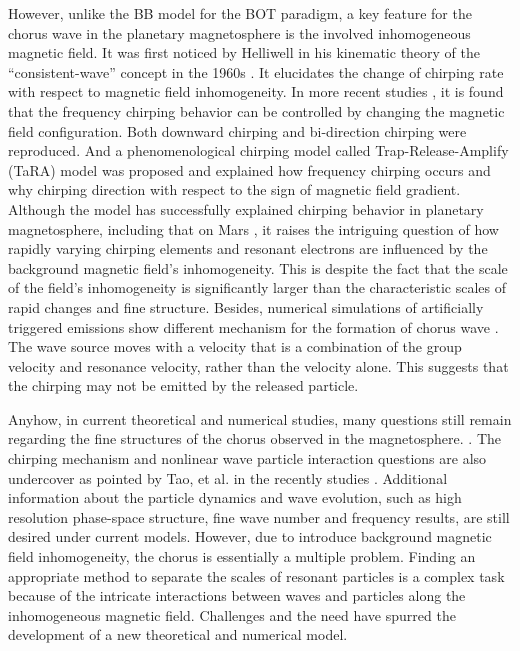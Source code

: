 However, unlike the BB model for the BOT paradigm, a key feature for the chorus wave in the planetary magnetosphere is the involved inhomogeneous magnetic field. 
It was first noticed by Helliwell in his kinematic theory of the ``consistent-wave'' concept in the 1960s \cite{helliwell_theory_1967}.
It elucidates the change of chirping rate with respect to magnetic field inhomogeneity.
In more recent studies \cite{wu_controlling_2020,fujiwara2023}, it is found that the frequency chirping behavior can be controlled by changing the magnetic field configuration. Both downward chirping and bi-direction chirping were reproduced.
And a phenomenological chirping model called Trap-Release-Amplify (TaRA) model was proposed and explained how frequency chirping occurs and why chirping direction with respect to the sign of magnetic field gradient.
Although the model has successfully explained chirping behavior in planetary magnetosphere, including that on Mars \cite{teng2023}, it raises the intriguing question of how rapidly varying chirping elements and resonant electrons are influenced by the background magnetic field's inhomogeneity.
This is despite the fact that the scale of the field's inhomogeneity is significantly larger than the characteristic scales of rapid changes and fine structure.
Besides, numerical simulations of artificially triggered emissions show different mechanism for the formation of chorus wave \cite{nogi2022,nogi2023}. 
The wave source moves with a velocity that is a combination of the group velocity and resonance velocity, rather than the velocity alone. This suggests that the chirping may not be emitted by the released particle.

Anyhow, in current theoretical and numerical studies, many questions still remain regarding the fine structures of the chorus observed in the magnetosphere. \cite{zhang2021}. 
The chirping mechanism and nonlinear wave particle interaction questions are also undercover as pointed by Tao, et al. in the recently studies \cite{tao_theoretical_2020,tao_trap-release-amplify_2021}. Additional information about the particle dynamics and wave evolution, such as high resolution phase-space structure, fine wave number and frequency results, are still desired under current models.
However, due to introduce background magnetic field inhomogeneity, the chorus is essentially a multiple problem. 
Finding an appropriate method to separate the scales of resonant particles is a complex task because of the intricate interactions between waves and particles along the inhomogeneous magnetic field. 
Challenges and the need have spurred the development of a new theoretical and numerical model.

